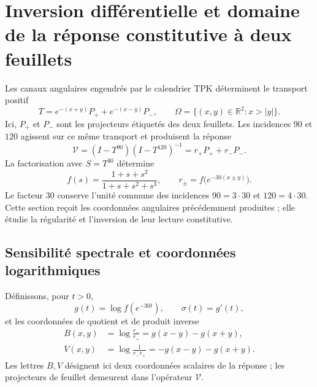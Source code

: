 
\section[Inversion différentielle de la réponse constitutive]{Inversion différentielle et domaine de la réponse constitutive à deux feuillets}
\label{jc:sec:constitutiva}

Les canaux angulaires engendrés par le calendrier TPK déterminent le transport positif
\[
T=e^{-(x+y)}P_++e^{-(x-y)}P_-,\qquad
\Omega=\{(x,y)\in\mathbb R^2:x>|y|\}.
\]
Ici, $P_+$ et $P_-$ sont les projecteurs étiquetés des deux feuillets. Les incidences $90$ et $120$ agissent sur ce même transport et produisent la réponse
\[
\mathcal V=(I-T^{90})(I-T^{120})^{-1}=r_+P_++r_-P_-.
\]
La factorisation avec $S=T^{30}$ détermine
\begin{equation}
f(s)=\frac{1+s+s^2}{1+s+s^2+s^3},\qquad
r_\pm=f\bigl(e^{-30(x\pm y)}\bigr).
\label{jc:eq:respuesta}
\end{equation}
Le facteur $30$ conserve l’unité commune des incidences $90=3\cdot30$ et $120=4\cdot30$. Cette section reçoit les coordonnées angulaires précédemment produites ; elle étudie la régularité et l’inversion de leur lecture constitutive.

\subsection{Sensibilité spectrale et coordonnées logarithmiques}

Définissons, pour $t>0$,
\[
g(t)=\log f(e^{-30t}),\qquad \sigma(t)=g'(t),
\]
et les coordonnées de quotient et de produit inverse
\begin{align}
B(x,y)&=\log\frac{r_-}{r_+}=g(x-y)-g(x+y),\\
V(x,y)&=\log\frac1{r_-r_+}=-g(x-y)-g(x+y).
\label{jc:eq:bv}
\end{align}
Les lettres $B,V$ désignent ici deux coordonnées scalaires de la réponse ; les projecteurs de feuillet demeurent dans l’opérateur $\mathcal V$.

